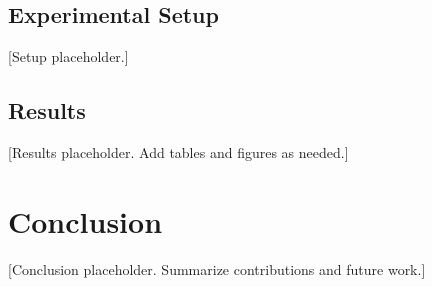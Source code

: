\documentclass[runningheads]{llncs}
\begin{document}
\subsection{Experimental Setup}
[Setup placeholder.]
%
\subsection{Results}
[Results placeholder. Add tables and figures as needed.]
%

%

\section{Conclusion}
%
[Conclusion placeholder. Summarize contributions and future work.]

%
%


\end{document}
